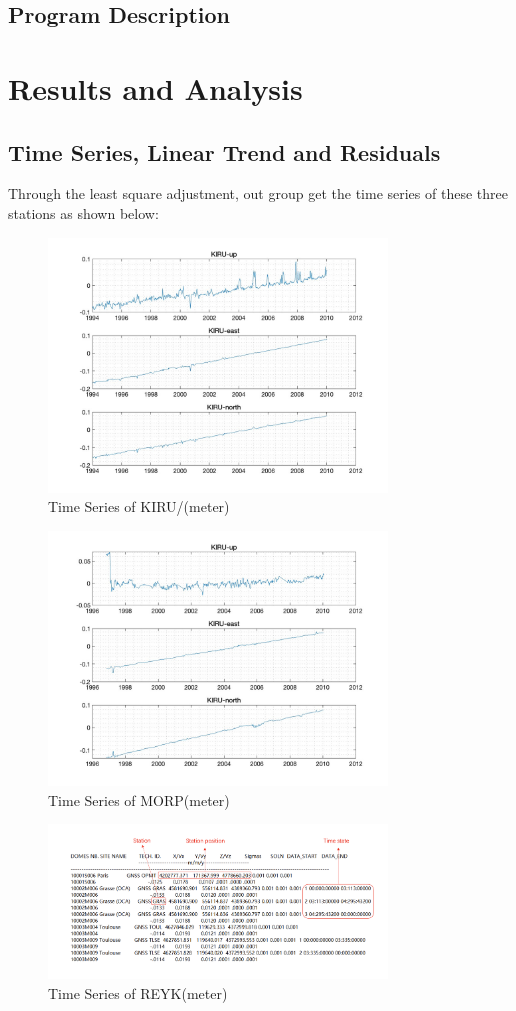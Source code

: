 \documentclass{article}
\begin{document}
\subsection{Program Description}

\section{Results and Analysis}
\subsection{Time Series, Linear Trend and Residuals}
Through the least square adjustment, out group get the time series of these three stations as shown below:
\begin{figure}[htbp]
  \centering
  \includegraphics[width=9cm]{../result/KIRU/KIRU_1.jpg}
  \captionsetup{skip=0.2cm}
  \caption{Time Series of KIRU/(meter)}
  \label{fig:Ori_KIRU}
\end{figure}
\begin{figure}[htbp]
  \centering
  \includegraphics[width=9cm]{../result/MORP/MORP_1.jpg}
  \caption{Time Series of MORP(meter)}
  \label{fig:Ori_MORP}
\end{figure}
\begin{figure}[htbp]
  \centering
  \includegraphics[width=9cm]{../source/ITRF2008.png}
  \caption{Time Series of REYK(meter)}
  \label{fig:Ori_REYK}
\end{figure}
\end{document}
